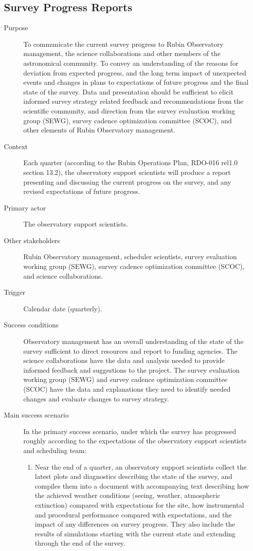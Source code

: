 \subsection{Survey Progress Reports}
\label{sec:orgb80a5cc}
\begin{description}
\item[{Purpose}] To communicate the current survey progress to Rubin Observatory management, the science collaborations and other members of the astronomical community. To convey an understanding of the reasons for deviation from expected progress, and the long term impact of unexpected events and changes in plans to expectations of future progress and the final state of the survey. Data and presentation should be sufficient to elicit informed survey strategy related feedback and recommendations from the scientific community, and direction from the survey evaluation working group (SEWG), survey cadence optimization committee (SCOC), and other elements of Rubin Observatory management.
\item[{Context}] Each quarter (according to the Rubin Operations Plan, RDO-016 rel1.0 section 13.2), the observatory support scientists will produce a report presenting and discussing the current progress on the survey, and any revised expectations of future progress.
\item[{Primary actor}] The observatory support scientists.
\item[{Other stakeholders}] Rubin Observatory management, scheduler scientists, survey evaluation working group (SEWG), survey cadence optimization committee (SCOC), and science collaborations.
\item[{Trigger}] Calendar date (quarterly).
\item[{Success conditions}] Observatory management has an overall understanding of the state of the survey sufficient to direct resources and report to funding agencies. The science collaborations have the data and analysis needed to provide informed feedback and suggestions to the project. The survey evaluation working group (SEWG) and survey cadence optimization committee (SCOC) have the data and explanations they need to identify needed changes and evaluate changes to survey strategy.
\item[{Main success scenario}] In the primary success scenario, under which the survey has progressed roughly according to the expectations of the observatory support scientists and scheduling team:
\begin{enumerate}
\item Near the end of a quarter, an observatory support scientists collect the latest plots and diagnostics describing the state of the survey, and compiles them into a document with accompanying text describing how the achieved weather conditions (seeing, weather, atmospheric extinction) compared with expectations for the site, how instrumental and procedural performance compared with expectations, and the impact of any differences on survey progress. They also include the results of simulations starting with the current state and extending through the end of the survey.

\end{enumerate}
\end{description}
